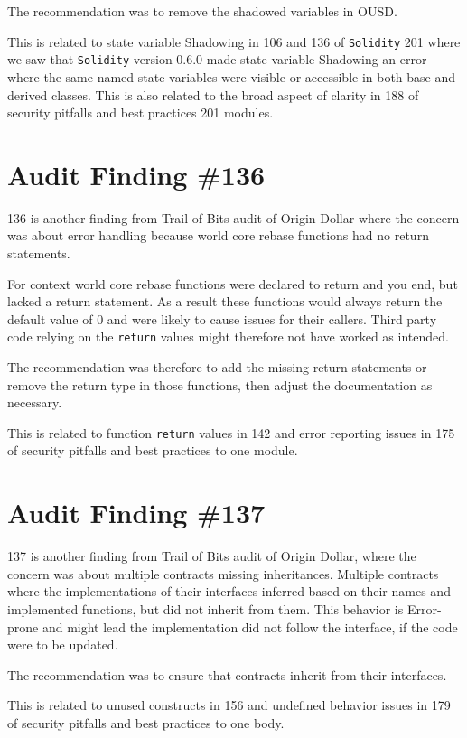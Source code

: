 The recommendation was to remove the shadowed variables in OUSD.

This is related to state variable Shadowing in 106 and 136 of \verb|Solidity| 201 where we saw that \verb|Solidity| version 0.6.0 made state variable Shadowing an error where the same named state variables were visible or accessible in both base and derived classes. This is also related to the broad aspect of clarity in 188 of security pitfalls and best practices 201 modules.

\section{Audit Finding \#136}

136 is another finding from Trail of Bits audit of Origin Dollar where the concern was about error handling because world core rebase functions had no return statements. 

For context world core rebase functions were declared to return and you end, but lacked a return statement. As a result these functions would always return the default value of 0 and were likely to cause issues for their callers. Third party code relying on the \verb|return| values might therefore not have worked as intended.

The recommendation was therefore to add the missing return statements or remove the return type in those functions, then adjust the documentation as necessary.

This is related to function \verb|return| values in 142 and error reporting issues in 175 of security pitfalls and best practices to one module.

\section{Audit Finding \#137}

137 is another finding from Trail of Bits audit of Origin Dollar, where the concern was about multiple contracts missing inheritances. Multiple contracts where the implementations of their interfaces inferred based on their names and implemented functions, but did not inherit from them. This behavior is Error-prone and might lead the implementation did not follow the interface, if the code were to be updated.

The recommendation was to ensure that contracts inherit from their interfaces.

This is related to unused constructs in 156 and undefined behavior issues in 179 of security pitfalls and best practices to one body.

